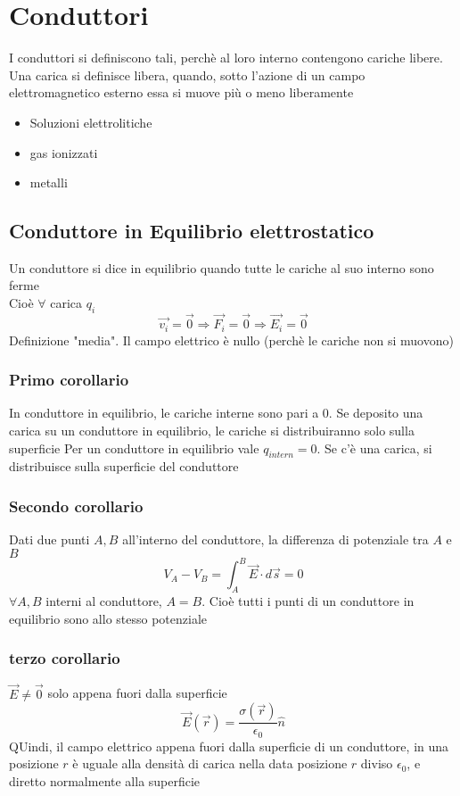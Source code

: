 \documentclass[a4paper]{report}
\begin{document}
  \section{Conduttori}
  I conduttori si definiscono tali, perchè al loro interno contengono cariche libere. Una carica si definisce libera, quando, sotto l'azione di un campo elettromagnetico esterno essa si muove più o meno liberamente
  \begin{itemize}
    \item Soluzioni elettrolitiche
      \item gas ionizzati
    \item metalli
  \end{itemize}

  \subsection{Conduttore in Equilibrio elettrostatico}
  Un conduttore si dice in equilibrio quando tutte le cariche al suo interno sono ferme\\
  Cioè $\forall$ carica $q_i$
  $$\vec{v_i} = \vec{0} \Rightarrow \vec{F_i} = \vec{0} \Rightarrow \vec{E_i} = \vec{0}$$
  Definizione "media". Il campo elettrico è nullo (perchè le cariche non si muovono)

  \subsubsection{Primo corollario}
  In conduttore in equilibrio, le cariche interne sono pari a $0$.
  Se deposito una carica su un conduttore in equilibrio, le cariche si distribuiranno solo sulla superficie
  Per un conduttore in equilibrio vale $q_{intern} =0$. Se c'è una carica, si distribuisce sulla superficie del conduttore
  \subsubsection{Secondo corollario}
  Dati due punti $A, B$ all'interno del conduttore, la differenza di potenziale tra $A$ e $B$
  $$V_A - V_B = \int_A^B \vec{E}\cdot d\vec{s}=0 $$
  $\forall A,B$ interni al conduttore, $A=B$. Cioè tutti i punti di un conduttore in equilibrio sono allo stesso potenziale
  \subsubsection{terzo corollario}
  \( \vec{E} \neq \vec{0} \) solo appena fuori dalla superficie
  $$ \vec{E}(\vec{r}) = \frac{\sigma(\vec{r})}{\epsilon_0} \hat{n} $$
  QUindi, il campo elettrico appena fuori dalla superficie di un conduttore, in una posizione $r$ è uguale alla densità di carica nella data posizione $r$ diviso $\epsilon_0$, e diretto normalmente alla superficie
\end{document}
